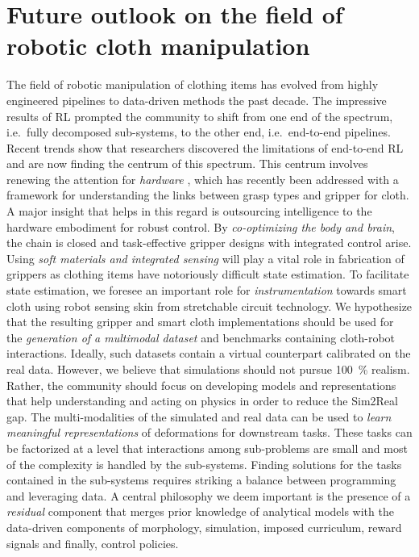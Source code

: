 \documentclass[\home/main.tex]{subfiles}
\begin{document}
\section{Future outlook on the field of robotic cloth manipulation} %

The field of robotic manipulation of clothing items has evolved from highly engineered pipelines to data-driven methods the past 
decade. The impressive results of \gls{RL} prompted the community to shift from one end of the spectrum, i.e.\ fully decomposed sub-systems, to the other end, i.e.\ end-to-end pipelines. Recent trends show that researchers discovered the limitations of end-to-end \gls{RL} and are now finding the centrum of this spectrum. 
This centrum involves renewing the attention for \emph{hardware} , which has recently been addressed with a framework for understanding the links between grasp types and gripper for cloth. A major insight that helps in this regard is outsourcing intelligence to the hardware embodiment for robust control. By \emph{co-optimizing the body and brain}, the chain is closed and task-effective gripper designs with integrated control arise. 
Using \emph{soft materials and integrated sensing} will play a vital role in fabrication of grippers as clothing items have notoriously difficult state estimation.
To facilitate state estimation, we foresee an important role for \emph{instrumentation} towards smart cloth using robot sensing skin from stretchable circuit technology. 
We hypothesize that the resulting gripper and smart cloth implementations should be used for the \emph{generation of a multimodal dataset} and benchmarks containing cloth-robot interactions. Ideally, such datasets contain a virtual counterpart calibrated on the real data. However, we believe that simulations should not pursue \qty{100}{\percent} realism. Rather, the community should focus on developing models and representations that help understanding and acting on physics in order to reduce the Sim2Real gap.  
The multi-modalities of the simulated and real data can be used to \emph{learn meaningful representations} of deformations for downstream tasks.
These tasks can be factorized at a level that interactions among sub-problems are small and most of the complexity is handled by the sub-systems. %
Finding solutions for the tasks contained in the sub-systems requires striking a balance between programming and leveraging data. A central philosophy we deem important is the presence of a \emph{residual} component that merges prior knowledge of analytical models with the data-driven components of morphology, simulation, imposed curriculum, reward signals and finally, control policies. 
 
\end{document}
